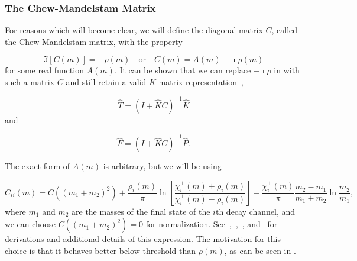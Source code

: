 \subsubsection{The Chew-Mandelstam Matrix}

For reasons which will become clear, we will define the diagonal matrix $C$, called the Chew-Mandelstam matrix, with the property

\begin{equation}
  \Im[C(m)] = -\rho(m)\quad\text{or}\quad C(m) = A(m) - \imath\rho(m)
\end{equation}
for some real function $A(m)$. It can be shown that we can replace $-\imath\rho$ in  with such a matrix $C$ and still retain a valid $K$-matrix representation~\cite{Wilson2015},

\begin{equation}
  \hat{T} = (I + \hat{K}C)^{-1}\hat{K}
\end{equation}
and

\begin{equation}
  \hat{F} = (I + \hat{K}C)^{-1}\hat{P}.
  \label{eq:k-matrix-production-amplitude-chew}
\end{equation}

The exact form of $A(m)$ is arbitrary, but we will be using

\begin{equation}
  C_{ii}(m) = C((m_1 + m_2)^2) + \frac{\rho_i(m)}{\pi}\ln\left[\frac{\chi^+_i(m) + \rho_i(m)}{\chi^+_i(m) - \rho_i(m)}\right] - \frac{\chi^+_i(m)}{\pi}\frac{m_2 - m_1}{m_1 + m_2}\ln\frac{m_2}{m_1},
  \label{eq:chew-mandelstam}
\end{equation}
where $m_1$ and $m_2$ are the masses of the final state of the $i$th decay channel, and we can choose $C((m_1 + m_2)^2) = 0$ for normalization. See~\cite{Oller1999},~\cite{Basdevant1977},~\cite{Oller2001}, and~\cite{Reid1984} for derivations and additional details of this expression. The motivation for this choice is that it behaves better below threshold than $\rho(m)$, as can be seen in .

